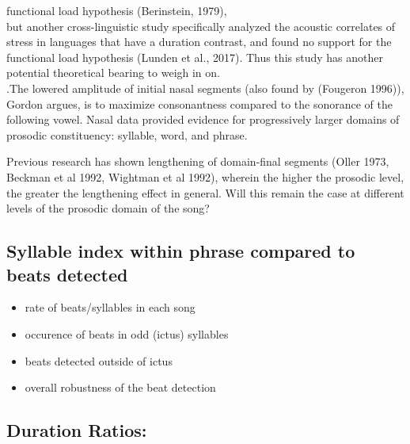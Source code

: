 \documentclass[11pt]{article}
\begin{document}
 
functional load hypothesis (Berinstein, 1979), \\
but another cross-linguistic study specifically analyzed the acoustic correlates of stress in languages that have a duration contrast, and found no support for the functional load hypothesis (Lunden et al., 2017). Thus this study has another potential theoretical bearing to weigh in on. 
\\
.The lowered amplitude of initial nasal segments (also found by (Fougeron 1996)), Gordon argues, is to maximize consonantness compared to the sonorance of the following vowel. Nasal data provided evidence for progressively larger domains of prosodic constituency: syllable, word, and phrase. 

Previous research has shown lengthening of domain-final segments (Oller 1973, Beckman et al 1992, Wightman et al 1992), wherein the higher the prosodic level, the greater the lengthening effect in general. Will this remain the case at different levels of the prosodic domain of the song?


\subsection{Syllable index within phrase compared to beats detected}
\begin{itemize}
\item rate of beats/syllables in each song
\item occurence of beats in odd (ictus) syllables
\item beats detected outside of ictus
\item overall robustness of the beat detection
\end{itemize}
\subsection{Duration Ratios:} \\
\end{document}
